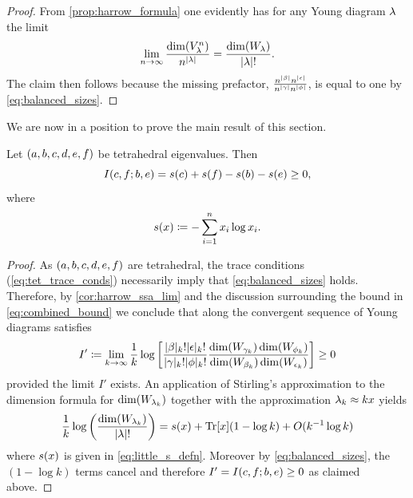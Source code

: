 \documentclass[notitlepage, 10pt]{article}
\begin{document}
\begin{proof}
    From \cref{prop:harrow_formula} one evidently has for any Young diagram $\lambda$ the limit
    \begin{equation}
        \lim_{n\to\infty} \frac{\dim(V_{\lambda}^{n})}{n^{{|\lambda|}}} = \frac{\dim(W_{\lambda})}{{|\lambda|}!}.
    \end{equation}
    The claim then follows because the missing prefactor, $\frac{n^{{|\beta|}}n^{{|\epsilon|}}}{n^{{|\gamma|}}n^{{|\phi|}}}$, is equal to one by \cref{eq:balanced_sizes}.
\end{proof}
We are now in a position to prove the main result of this section.
\begin{thm}
    Let $(a,b,c,d,e,f)$ be tetrahedral eigenvalues.
    Then
    \begin{equation}
        I(c, f; b, e)  = s(c) + s(f) - s(b) - s(e) \geq 0,
    \end{equation}
    where
    \begin{equation}
        \label{eq:little_s_defn}
        s(x) \coloneqq - \sum_{i=1}^{n} x_i \log x_i.
    \end{equation}
\end{thm}
\begin{proof}
    As $(a,b,c,d,e,f)$ are tetrahedral, the trace conditions (\cref{eq:tet_trace_conds}) necessarily imply that \cref{eq:balanced_sizes} holds.
    Therefore, by \cref{cor:harrow_ssa_lim} and the discussion surrounding the bound in \cref{eq:combined_bound} we conclude that along the convergent sequence of Young diagrams satisfies
    \begin{equation}
        I' \coloneqq \lim_{k\to\infty} \frac{1}{k} \log \left[\frac{{|\beta|_k}!{|\epsilon|_k}!}{{|\gamma|_k}!{|\phi|_k}!}
        \frac{\dim(W_{\gamma_k}) \dim(W_{\phi_k})}{\dim(W_{\beta_k}) \dim(W_{\epsilon_k})}\right] \geq 0
    \end{equation}
    provided the limit $I'$ exists.
    An application of Stirling's approximation \cite{robbins1955remark} to the dimension formula for $\dim(W_{\lambda_k})$ together with the approximation $\lambda_k \approx k x$ yields
    \begin{equation}
        \frac{1}{k}\log \left(\frac{\dim(W_{\lambda_k})}{{|\lambda|}!}\right) = s(x) + {\operatorname{Tr}[x]} (1-\log k) + O(k^{-1}\log k)
    \end{equation}
    where $s(x)$ is given in \cref{eq:little_s_defn}.
    Moreover by \cref{eq:balanced_sizes}, the $(1-\log k)$ terms cancel and therefore $I' = I(c, f; b, e) \geq 0$ as claimed above.
\end{proof}
\end{document}
